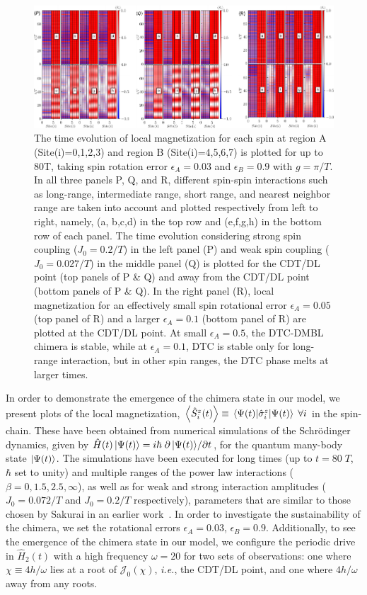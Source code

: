 \documentclass[%
nofootinbib,
reprint,
superscriptaddress,
amsmath,amssymb,showkeys,
aps,
prb,
]{revtex4-2}
\begin{document}
	
	\begin{figure}[t!]
		\centering
		\includegraphics[width=17.5cm]{sz_t_strongweakJ_ea_N_8.pdf}
		\caption{The time evolution of local magnetization for each spin at region A (Site(i)=0,1,2,3) and region B (Site(i)=4,5,6,7) is plotted for up to 80T, taking spin rotation error $\epsilon_A = 0.03$ and $\epsilon_B = 0.9$ with $g=\pi/T$.  In all three panels P, Q, and R, different spin-spin interactions such as long-range, intermediate range, short range, and nearest neighbor range are taken into account and plotted respectively from left to right, namely, (a, b,c,d) in the top row and (e,f,g,h) in the bottom row of each panel. The time evolution considering strong spin coupling ($J_0 = 0.2/T$) in the left panel (P) and weak spin coupling ($J_0 = 0.027/T$) in the middle panel (Q) is plotted  for the CDT/DL point (top panels of P \& Q) and away from the CDT/DL point (bottom panels of P \& Q). In the right panel (R), local magnetization for an effectively small spin rotational error $\epsilon_A = 0.05$ (top panel of R) and a larger $\epsilon_A = 0.1$ (bottom panel of R) are plotted at the CDT/DL point. At small $\epsilon_A=0.5$, the DTC-DMBL chimera is stable, while at $\epsilon_A=0.1$, DTC is stable only for long-range interaction, but in other spin ranges, the DTC phase melts at larger times.}
		\label{Fig:strong_weak_ea}
	\end{figure}
	
	In order to demonstrate the emergence of the chimera state in our model, we present plots of the local magnetization, $\expval{\hat{S}^z_i (t)} \equiv \expval{\hat{\sigma}^z_i}{\Psi(t)}\;\forall i$ in the spin- chain. These have been obtained from numerical simulations of the Schr\"odinger dynamics, given by $\hat{H}(t)\ket{\Psi(t)}= i \hbar \pdv*{\ket{\Psi(t)}}{t}$, for the quantum many-body  state $\ket{\Psi(t)}$. The simulations have been executed for long times (up to $t=80\;T$, $\hbar$ set to unity) and multiple ranges of the power law interactions ($\beta = 0,1.5,2.5,\infty$), as well as  for weak and strong interaction amplitudes ( $J_0 = 0.072/T$ and $J_0 = 0.2/T$ respectively), parameters that are similar to those chosen by Sakurai in an earlier work~\cite{sakurai_phys_nodate}. In order to investigate the sustainability of the chimera, we set the rotational errors $\epsilon_A = 0.03$, $\epsilon_B = 0.9$. Additionally, to see the emergence of the chimera state in our model, we configure the periodic drive in $\hat{H}_2(t)$ with a high frequency $\omega=20$ for two sets of observations: one where $\chi\equiv4h/\omega$ lies at a root of $\mathcal{J}_0(\chi)$, \textit{i.e.}, the CDT/DL point, and one where  $4h/\omega$ away from any roots. 
	
\end{document}
